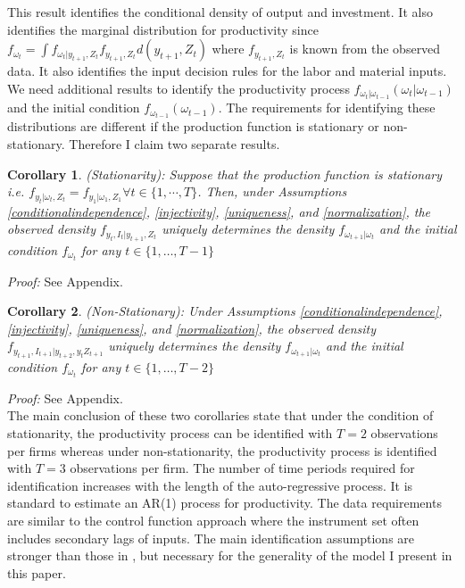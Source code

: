 \documentclass{article}
\newtheorem{corollary}{Corollary}[section]
\begin{document}
This result identifies the conditional density of output and investment. It also identifies the marginal distribution for productivity since $f_{\omega_{t}}=\int f_{\omega_{t}|y_{t+1}, Z_{t}}f_{y_{t+1},Z_{t}}d(y_{t+1},Z_{t})$ where $f_{y_{t+1},Z_{t}}$ is known from the observed data. It also identifies the input decision rules for the labor and material inputs. We need additional results to identify the productivity process $f_{\omega_{t}|\omega_{t-1}}(\omega_{t}|\omega_{t-1})$ and the initial condition $f_{\omega_{t-1}}(\omega_{t-1})$. The requirements for identifying these distributions are different if the production function is stationary or non-stationary. Therefore I claim two separate results.

\begin{corollary} \label{stationary} (Stationarity): Suppose that the production function is stationary i.e. $f_{y_{t}|\omega_{t}, Z_{t}}=f_{y_{1}|\omega_{1}, Z_{1}} \forall t\in\{1,\cdots,T\}$. Then, under Assumptions \ref{conditionalindependence}, \ref{injectivity}, \ref{uniqueness}, and \ref{normalization}, the observed density $f_{y_{t}, I_{t}|y_{t+1}, Z_{t}}$ uniquely determines the density $f_{\omega_{t+1}|\omega_{t}}$ and the initial condition $f_{\omega_{t}}$ for any $t\in\{1,\dots,T-1\}$
\end{corollary}
\textit{Proof:} See Appendix.\\
\begin{corollary} \label{stationary} (Non-Stationary): Under Assumptions \ref{conditionalindependence}, \ref{injectivity}, \ref{uniqueness}, and \ref{normalization}, the observed density $f_{y_{t+1}, I_{t+1}|y_{t+2}, y_{t} Z_{t+1}}$ uniquely determines the density $f_{\omega_{t+1}|\omega_{t}}$ and the initial condition $f_{\omega_{t}}$ for any $t\in\{1,\dots,T-2\}$
\end{corollary}
\textit{Proof:} See Appendix.\\

The main conclusion of these two corollaries state that under the condition of stationarity, the productivity process can be identified with $T=2$ observations per firms whereas under non-stationarity, the productivity process is identified with $T=3$ observations per firm. The number of time periods required for identification increases with the length of the auto-regressive process. It is standard to estimate an AR(1) process for productivity. The data requirements are similar to the control function approach where the instrument set often includes secondary lags of inputs. The main identification assumptions are stronger than those in \cite{Hu2019}, but necessary for the generality of the model I present in this paper.
\end{document}
